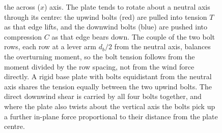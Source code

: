 \begin{figure}[htbp]
{the across ($x$) axis. The plate tends to rotate about a neutral axis
through its centre: the upwind bolts (red) are pulled into tension $T$ as
that edge lifts, and the downwind bolts (blue) are pushed into compression
$C$ as that edge bears down. The couple of the two bolt rows, each row at a
lever arm $d_b/2$ from the neutral axis, balances the overturning moment, so
the bolt tension follows from the moment divided by the row spacing, not from
the wind force directly. A rigid base plate with bolts equidistant from the
neutral axis shares the tension equally between the two upwind bolts. The
direct downwind shear is carried by all four bolts together, and where the
plate also twists about the vertical axis the bolts pick up a further
in-plane force proportional to their distance from the plate centre.}
\label{fig:vol03ch02:anchor-bolt-group}
\end{figure}
